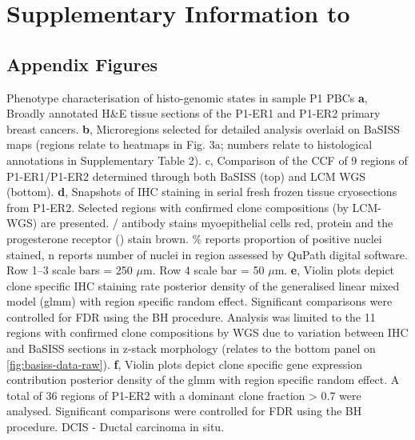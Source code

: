 \chapter{Supplementary Information to \texorpdfstring{}{}}

\section{Appendix Figures}

    {Phenotype characterisation of histo-genomic states in sample P1 PBCs}
    {\textbf{a}, Broadly annotated H\&E tissue sections of the P1-ER1 and P1-ER2 primary breast cancers. \textbf{b}, Microregions selected for detailed analysis overlaid on \ac{BaSISS} maps (regions relate to heatmaps in Fig. 3a; numbers relate to histological annotations in Supplementary Table 2). c, Comparison of the \acf{CCF} of 9 regions of P1-ER1/P1-ER2 determined through both \ac{BaSISS} (top) and \acf{LCM} \acf{WGS} (bottom). \textbf{d}, Snapshots of \acf{IHC} staining in serial fresh frozen tissue cryosections from P1-ER2. Selected regions with confirmed clone compositions (by \ac{LCM}-\ac{WGS}) are presented. / antibody stains myoepithelial cells red,  protein and the progesterone receptor () stain brown. \% reports proportion of positive nuclei stained, n reports number of nuclei in region assessed by QuPath digital software. Row 1–3 scale bars = 250 $\mu$m. Row 4 scale bar = 50 $\mu$m. \textbf{e}, Violin plots depict clone specific  \ac{IHC} staining rate posterior density of the generalised linear mixed model (glmm) with region specific random effect. Significant comparisons were controlled for \ac{FDR} using the \ac{BH} procedure. Analysis was limited to the 11 regions with confirmed clone compositions by WGS due to variation between \ac{IHC} and \ac{BaSISS} sections in z-stack morphology (relates to the bottom panel on \cref{fig:basiss-data-raw}). \textbf{f}, Violin plots depict clone specific gene expression contribution posterior density of the glmm with region specific random effect. A total of 36 regions of P1-ER2 with a dominant clone fraction > 0.7 were analysed. Significant comparisons were controlled for \ac{FDR} using the \ac{BH} procedure. \ac{DCIS} - Ductal carcinoma in situ.}

